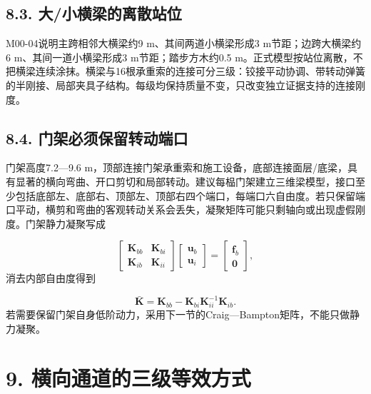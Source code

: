 \documentclass[UTF8,a4paper,11pt,fontset=none]{ctexart}
\begin{document}
\subsection*{8.3. 大/小横梁的离散站位}
M00-04说明主跨相邻大横梁约9 m、其间两道小横梁形成3 m节距；边跨大横梁约6 m、其间一道小横梁形成3 m节距；踏步方木约0.5 m。正式模型按站位离散，不把横梁连续涂抹。横梁与16根承重索的连接可分三级：铰接平动协调、带转动弹簧的半刚接、局部夹具子结构。每级均保持质量不变，只改变独立证据支持的连接刚度。\par
{}
\subsection*{8.4. 门架必须保留转动端口}
门架高度7.2—9.6 m，顶部连接门架承重索和施工设备，底部连接面层/底梁，具有显著的横向弯曲、开口剪切和局部转动。建议每榀门架建立三维梁模型，接口至少包括底部左、底部右、顶部左、顶部右四个端口，每端口六自由度。若只保留端口平动，横剪和弯曲的客观转动关系会丢失，凝聚矩阵可能只剩轴向或出现虚假刚度。门架静力凝聚写成\par
\[
\begin{bmatrix}
\mathbf K_{bb}&\mathbf K_{bi}\\
\mathbf K_{ib}&\mathbf K_{ii}
\end{bmatrix}
\begin{bmatrix}
\mathbf u_b\\
\mathbf u_i
\end{bmatrix}
=
\begin{bmatrix}
\mathbf f_b\\
\mathbf0
\end{bmatrix},
\]
消去内部自由度得到\par
\[
\bar{\mathbf K}
=\mathbf K_{bb}
-\mathbf K_{bi}\mathbf K_{ii}^{-1}\mathbf K_{ib}.
\]
若需要保留门架自身低阶动力，采用下一节的Craig—Bampton矩阵，不能只做静力凝聚。\par
{}
\section*{9. 横向通道的三级等效方式}
\end{document}
